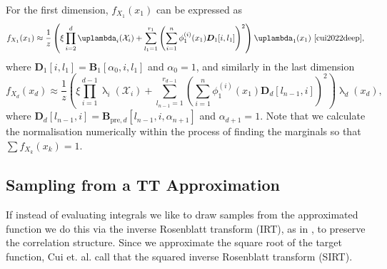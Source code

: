 For the first dimension, $f_{X_1}(x_1)$ can be expressed as
\begin{equation}
	f_{X_1}(x_1)  \approx \frac{1}{z} \left(\xi \prod_{i=2}^{d} \uplambda_i(\mathcal{X}_i) + \sum_{l_1=1}^{r_1} \left(\sum_{i=1}^{n} \phi^{(i)}_1(x_1) \bm{D}_1[i, l_1] \right)^2 \right) \uplambda_1(x_1)\, \,  \text{\cite[Eq. 30]{cui2022deep}},
	\label{eq:firstMarg}
\end{equation}
where $\bm{D}_1[i, l_1] = \bm{B}_1[\alpha_0, i, l_1]$ and $\alpha_0 = 1$,
and similarly in the last dimension
\begin{equation}
	f_{X_d}(x_d)  \approx \frac{1}{z} \left(\xi \prod_{i=1}^{d-1} \uplambda_i(\mathcal{X}_i) + \sum_{l_{n-1}=1}^{r_{d-1}} \left(\sum_{i=1}^{n} \phi^{(i)}_1(x_1) \bm{D}_d[l_{n-1},i] \right)^2 \right) \uplambda_d(x_d),
\end{equation}
where $\bm{D}_d[l_{n-1},i] = \bm{B}_{\text{pre},d}[l_{n-1}, i, \alpha_{n+1}]$ and $\alpha_{d+1} = 1$.
Note that we calculate the normalisation numerically within the process of finding the marginals so that $\sum f_{X_k}(x_k) = 1$.

\subsection{Sampling from a TT Approximation}
If instead of evaluating integrals we like to draw samples from the approximated function we do this via the inverse Rosenblatt transform (IRT), as in \cite{dolgov2020approximation}, to preserve the correlation structure.
Since we approximate the square root of the target function, Cui et. al. \cite{cui2022deep} call that the squared inverse Rosenblatt transform (SIRT).


